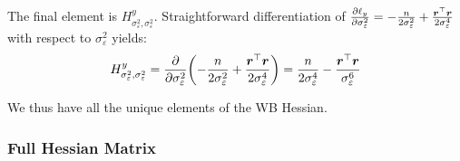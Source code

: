 The final element is $H^y_{\sigma_\varepsilon^2,\sigma_\varepsilon^2}$. Straightforward differentiation of $\frac{\partial \ell_y}{\partial \sigma_\varepsilon^2} = -\frac{n}{2\sigma_\varepsilon^2} + \frac{\bm{r}^\top\bm{r}}{2\sigma_\varepsilon^4}$ with respect to $\sigma_\varepsilon^2$ yields:
\begin{equation}
    H^y_{\sigma_\varepsilon^2,\sigma_\varepsilon^2} = \frac{\partial}{\partial \sigma_\varepsilon^2}\!\left(-\frac{n}{2\sigma_\varepsilon^2} + \frac{\bm{r}^\top\bm{r}}{2\sigma_\varepsilon^4}\right) =
    \frac{n}{2\sigma_\varepsilon^4} - \frac{\bm{r}^\top\bm{r}}{\sigma_\varepsilon^6}
\end{equation}

We thus have all the unique elements of the WB Hessian.

\subsubsection{Full Hessian Matrix}

